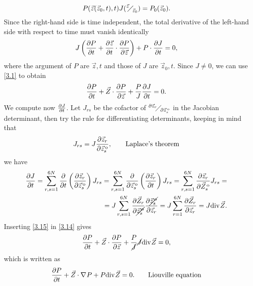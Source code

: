\begin{equation}
    P(\vec{z}(\vec{z}_0, t), t) J({}^{\vec{z}}{\mskip -5mu\diagup\mskip -3mu}_{\vec{z}_0}) = P_0(\vec{z}_0). \label{3.12}
\end{equation}
Since the right-hand side is time independent, the total derivative of the left-hand side with respect to time must vanish identically 
\begin{equation}
    J\left(\partialderivative{P}{t} + \partialderivative{\vec{z}}{t} \cdot \partialderivative{P}{\vec{z}}\right) + P \cdot \partialderivative{J}{t} = 0, \label{3.13}
\end{equation}
where the argument of \(P\) are \(\vec{z}, t\) and those of \(J\) are \(\vec{z}_0, t\). Since \(J \neq 0\), we can use \eqref{3.1} to obtain
\begin{equation}
    \partialderivative{P}{t} + \vec{Z}\cdot\partialderivative{P}{\vec{z}} + \frac{P}{J} \partialderivative{J}{t} = 0. \label{3.14}
\end{equation}
We compute now \(\partialderivative{J}{t}\). Let \(J_{rs}\) be the cofactor of \({}^{\partial \vec{z}_r}{\mskip -5mu\diagup\mskip -3mu}_{\partial \vec{z}_{s}^{\mskip 3mu \mathrm{o}}}\) in the Jacobian determinant, then try the rule for differentiating determinants, keeping in mind that 
\[
    J_{rs} = J \partialderivative{ \vec{z}_r}{ \vec{z}_{s}^{\mskip 3mu \mathrm{o}}}, \tag*{Laplace's theorem}
\]
we have 
\begin{equation}
    \begin{split}
        \partialderivative{J}{t} = \sum_{r,s = 1}^{6N} \pderivative{t} \left(\partialderivative{ \vec{z}_r}{ \vec{z}_{s}^{\mskip 3mu \mathrm{o}}}\right)J_{rs} = \sum_{r,s = 1}^{6N} \pderivative{\vec{z}_{s}^{\mskip 3mu \mathrm{o}}} \left(\partialderivative{\vec{z}_r}{t}\right) J_{rs} = \sum_{r,s = 1}^{6N} \partialderivative{\vec{z}_r}{\vec{Z}_{s}^{\mskip 3mu \mathrm{o}}} J_{rs} =\\ =
        J\sum_{r,s = 1}^{6N} \partialderivative{\vec{Z}_r}{\cancel{\vec{z}_{s}^{\mskip 3mu \mathrm{o}}}} \partialderivative{\cancel{\vec{z}_{s}^{\mskip 3mu \mathrm{o}}}}{\vec{z}_r} = J\sum_{r = 1}^{6N} \partialderivative{\vec{Z}_r}{\vec{z}_r} = J\div \vec{Z}. \label{3.15}
    \end{split}
\end{equation}
Inserting \eqref{3.15} in \eqref{3.14} gives 
\[
    \partialderivative{P}{t} + \vec{Z} \cdot \partialderivative{P}{\vec{z}} + \frac{P}{\cancel{J}} \cancel{J}    \div \vec{Z} = 0,
\]
which is written as 
\begin{equation*}
    \partialderivative{P}{t} + \vec{Z} \cdot \grad P + P\div \vec{Z} = 0. \tag*{Liouville equation}
\end{equation*}
